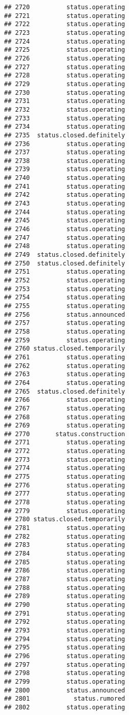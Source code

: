 \documentclass[
]{article}
\begin{document}
\begin{verbatim}
## 2720          status.operating
## 2721          status.operating
## 2722          status.operating
## 2723          status.operating
## 2724          status.operating
## 2725          status.operating
## 2726          status.operating
## 2727          status.operating
## 2728          status.operating
## 2729          status.operating
## 2730          status.operating
## 2731          status.operating
## 2732          status.operating
## 2733          status.operating
## 2734          status.operating
## 2735  status.closed.definitely
## 2736          status.operating
## 2737          status.operating
## 2738          status.operating
## 2739          status.operating
## 2740          status.operating
## 2741          status.operating
## 2742          status.operating
## 2743          status.operating
## 2744          status.operating
## 2745          status.operating
## 2746          status.operating
## 2747          status.operating
## 2748          status.operating
## 2749  status.closed.definitely
## 2750  status.closed.definitely
## 2751          status.operating
## 2752          status.operating
## 2753          status.operating
## 2754          status.operating
## 2755          status.operating
## 2756          status.announced
## 2757          status.operating
## 2758          status.operating
## 2759          status.operating
## 2760 status.closed.temporarily
## 2761          status.operating
## 2762          status.operating
## 2763          status.operating
## 2764          status.operating
## 2765  status.closed.definitely
## 2766          status.operating
## 2767          status.operating
## 2768          status.operating
## 2769          status.operating
## 2770       status.construction
## 2771          status.operating
## 2772          status.operating
## 2773          status.operating
## 2774          status.operating
## 2775          status.operating
## 2776          status.operating
## 2777          status.operating
## 2778          status.operating
## 2779          status.operating
## 2780 status.closed.temporarily
## 2781          status.operating
## 2782          status.operating
## 2783          status.operating
## 2784          status.operating
## 2785          status.operating
## 2786          status.operating
## 2787          status.operating
## 2788          status.operating
## 2789          status.operating
## 2790          status.operating
## 2791          status.operating
## 2792          status.operating
## 2793          status.operating
## 2794          status.operating
## 2795          status.operating
## 2796          status.operating
## 2797          status.operating
## 2798          status.operating
## 2799          status.operating
## 2800          status.announced
## 2801            status.rumored
## 2802          status.operating
\end{verbatim}
\end{document}
